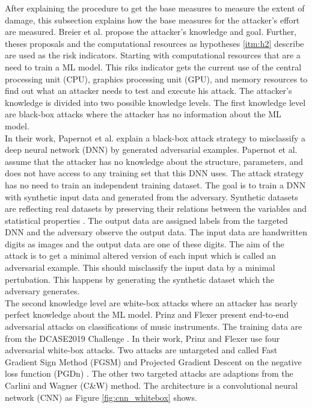 After explaining the procedure to get the base measures to measure the extent of damage, this subsection explains how the base measures for the attacker's effort are measured. Breier et al. \cite{DBLP:journals/corr/abs-2012-04884} propose the attacker's knowledge and goal. Further, theses proposals and the computational resources as hypotheses \ref{itm:h2} describe are used as the risk indicators. Starting with computational resources that are a need to train a ML model. This riks indicator gets the current use of the central processing unit (CPU), graphics processing unit (GPU), and memory resources to find out what an attacker needs to test and execute his attack. The attacker's knowledge is divided into two possible knowledge levels. The first knowledge level are black-box attacks where the attacker has no information about the ML model. \\
In their work, Papernot et al. \cite{DBLP:conf/ccs/PapernotMGJCS17} explain a black-box attack strategy to misclassify a deep neural network (DNN) \cite{DBLP:journals/spm/X12a} by generated adversarial examples. Papernot et al. assume that the attacker has no knowledge about the structure, parameters, and does not have access to any training set that this DNN uses. The attack strategy has no need to train an independent training dataset. The goal is to train a DNN with synthetic input data and generated from the adversary. Synthetic datasets are reflecting real datasets by preserving their relations between the variables and statistical properties \cite{Quintana2020ASD}. The output data are assigned labels from the targeted DNN and the adversary observe the output data. The input data are handwritten digits as
images and the output data are one of these digits. The aim of the attack is to get a minimal altered version of each input which is called an adversarial example. This should misclassify the input data by a minimal pertubation. This happens by generating the synthetic dataset which the adversary generates.\\
The second knowledge level are white-box attacks where an attacker has nearly perfect knowledge about the ML model. Prinz and Flexer \cite{DBLP:journals/corr/abs-2007-14714} present end-to-end adversarial attacks on classifications of music instruments. The training data are from the DCASE2019 Challenge \cite{DBLP:conf/dcase/FonsecaPFES19}. In their work, Prinz and Flexer use four adversarial white-box attacks. Two attacks are untargeted and called Fast Gradient Sign Method (FGSM) \cite{DBLP:journals/corr/GoodfellowSS14} and Projected Gradient Descent on the negative loss function (PGDn) \cite{DBLP:conf/iclr/MadryMSTV18}. The other two targeted attacks are adaptions from the Carlini and Wagner (C\&W) \cite{DBLP:conf/sp/Carlini018} method. The architecture is a convolutional neural network (CNN) \cite{DBLP:journals/corr/Kim14f} as Figure \ref{fig:cnn_whitebox} shows.

